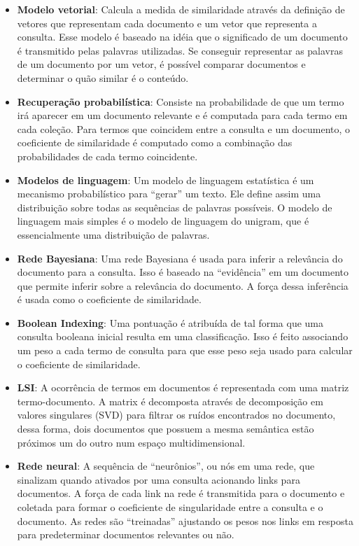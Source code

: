 \begin{itemize}
	\item{\textbf{Modelo vetorial}: Calcula a medida de similaridade através da definição de vetores que representam cada documento e um vetor que representa a consulta. Esse modelo é baseado na idéia que o significado de um documento é transmitido pelas palavras utilizadas. Se conseguir representar as palavras de um documento por um vetor, é possível comparar documentos e determinar o quão similar é o conteúdo.}
	
	\item{\textbf{Recuperação probabilística}: Consiste na probabilidade de que um termo irá aparecer em um documento relevante e é computada para cada termo em cada coleção. Para termos que coincidem entre a consulta e um documento, o coeficiente de similaridade é computado como a combinação das probabilidades de cada termo coincidente.}
	
	\item{\textbf{Modelos de linguagem}: Um modelo de linguagem estatística é um mecanismo probabilístico para “gerar” um texto. Ele define assim uma distribuição sobre todas as sequências de palavras possíveis. O modelo de linguagem mais simples é o modelo de linguagem do unigram, que é essencialmente uma distribuição de palavras.}
	
	\item{\textbf{Rede Bayesiana}: Uma rede Bayesiana é usada para inferir a relevância do documento para a consulta. Isso é baseado na “evidência” em um documento que permite inferir sobre a relevância do documento. A força dessa inferência é usada como o coeficiente de similaridade.}
	
	\item{\textbf{Boolean Indexing}: Uma pontuação é atribuída de tal forma que uma consulta booleana inicial resulta em uma classificação. Isso é feito associando um peso a cada termo de consulta para que esse peso seja usado para calcular o coeficiente de similaridade.}
	
	\item{\textbf{\ac{LSI}}: A ocorrência de termos em documentos é representada com uma matriz termo-documento. A matrix é decomposta através de decomposição em valores singulares (SVD) para filtrar os ruídos encontrados no documento, dessa forma, dois documentos que possuem a mesma semântica estão próximos um do outro num espaço multidimensional.}
	
	\item{\textbf{Rede neural}: A sequência de “neurônios”, ou nós em uma rede, que sinalizam quando ativados por uma consulta acionando links para documentos. A força de cada link na rede é transmitida para o documento e coletada para formar o coeficiente de singularidade entre a consulta e o documento. As redes são “treinadas” ajustando os pesos nos links em resposta para predeterminar documentos relevantes ou não.}
	

\end{itemize}
